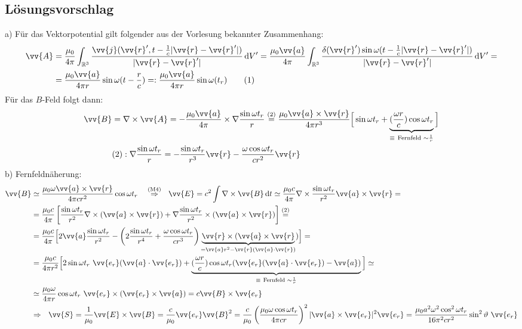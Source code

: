\documentclass[a4paper,12pt]{article}
\begin{document}
\subsection*{Lösungsvorschlag}
a) Für das Vektorpotential gilt folgender aus der Vorlesung bekannter Zusammenhang: 
\begin{align*}
\vv{A}&=\frac{\mu_0}{4\pi}\int_{\mathbb{R}^3}\frac{\vv{j}(\vv{r}', t-\frac{1}{c}|\vv{r}-\vv{r}'|)}{|\vv{r}-\vv{r}'|}\,\textrm{d}V'=\frac{\mu_0\vv{a}}{4\pi}\int_{\mathbb{R}^3}\frac{\delta (\vv{r}')\sin\omega (t-\frac{1}{c}|\vv{r}-\vv{r}'|)}{|\vv{r}-\vv{r}'|}\,\textrm{d}V'=\\
&=\frac{\mu_0\vv{a}}{4\pi r}\sin\omega (t-\frac{r}{c})=:\frac{\mu_0\vv{a}}{4\pi r}\sin\omega (t_r) \label{A aus j}\tag{1}
\end{align*} 
Für das $B$-Feld folgt dann:
\begin{align*}
\vv{B}&=\nabla\times\vv{A}=-\frac{\mu_0\vv{a}}{4\pi}\times\nabla\frac{\sin\omega t_r}{r}\overset{(2)}{=}\frac{\mu_0\vv{a}\times\vv{r}}{4\pi r^3}\Big[\sin\omega t_r+\underbrace{(\frac{\omega r}{c})\cos\omega t_r}_{\equiv\ \textrm{Fernfeld }\sim \frac{1}{r}}\Big]\\
&(2):\nabla\frac{\sin\omega t_r}{r}=-\frac{\sin\omega t_r}{r^3}\vv{r}-\frac{\omega\cos\omega t_r}{cr^2}\vv{r}
\end{align*}
b) Fernfeldnäherung:
\begin{align*}
\vv{B}&\simeq \frac{\mu_0\omega\vv{a}\times\vv{r}}{4\pi cr^2}\cos\omega t_r\ \ \ \overset{(\textrm{M}4)}{\Rightarrow}\ \ \vv{E}= c^2\int\nabla\times\vv{B}\,\textrm{d}t\simeq\frac{\mu_0c}{4\pi}\nabla\times\frac{\sin\omega t_r}{r^2}\vv{a}\times\vv{r}=\\
&=\frac{\mu_0c}{4\pi}\left[\frac{\sin\omega t_r}{r^2}\nabla\times(\vv{a}\times\vv{r})+\nabla\frac{\sin\omega t_r}{r^2}\times(\vv{a}\times\vv{r})\right]\overset{(2)}{=}\\
&=\frac{\mu_0c}{4\pi}\Big[2\vv{a}\frac{\sin\omega t_r}{r^2}-\left(2\frac{\sin\omega t_r}{r^4}+\frac{\omega\cos\omega t_r}{cr^3}\right)\underbrace{\vv{r}\times (\vv{a}\times\vv{r}}_{=\vv{a}r^2-\vv{r}(\vv{a}\cdot\vv{r})})\Big]=\\
&=\frac{\mu_0c}{4\pi r^2}\Big[2\sin\omega t_r\ \vv{e_r}(\vv{a}\cdot\vv{e_r})+\underbrace{(\frac{\omega r}{c})\cos\omega t_r (\vv{e_r}(\vv{a}\cdot\vv{e_r})-\vv{a})}_{\equiv\ \textrm{Fernfeld }\sim\frac{1}{r}}\Big]\simeq\\
&\simeq\frac{\mu_0\omega}{4\pi r}\cos\omega t_r\ \vv{e_r}\times(\vv{e_r}\times\vv{a})=c\vv{B}\times\vv{e_r}\\
&\Rightarrow\ \ \vv{S}=\frac{1}{\mu_0}\vv{E}\times\vv{B}=\frac{c}{\mu_0}\vv{e_r}\vv{B}^2=\frac{c}{\mu_0}\left(\frac{\mu_0\omega\cos\omega t_r}{4\pi cr}\right)^2|\vv{a}\times\vv{e_r}|^2\vv{e_r}=\frac{\mu_0a^2\omega^2\cos^2\omega t_r}{16\pi^2cr^2}\sin^2\vartheta\ \vv{e_r}
\end{align*}
\end{document}
